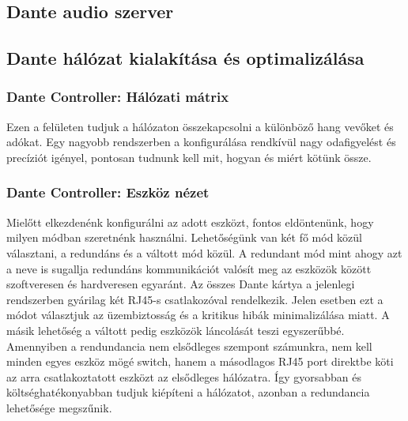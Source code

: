 \subsection{Dante audio szerver}



\subsection{Dante hálózat kialakítása és optimalizálása}
\subsubsection{Dante Controller: Hálózati mátrix}
Ezen a felületen tudjuk a hálózaton összekapcsolni a különböző hang vevőket és
adókat. Egy nagyobb rendszerben a konfigurálása rendkívül nagy odafigyelést és
precíziót igényel, pontosan tudnunk kell mit, hogyan és miért kötünk össze.
\subsubsection{Dante Controller: Eszköz nézet}
Mielőtt elkezdenénk konfigurálni az adott eszközt, fontos eldöntenünk, hogy
milyen módban szeretnénk használni.
Lehetőségünk van két fő mód közül választani, a redundáns és a
váltott mód közül. A redundant mód mint ahogy azt a neve is sugallja
redundáns kommunikációt valósít meg az eszközök között szoftveresen és
hardveresen egyaránt. Az összes Dante kártya a jelenlegi rendszerben gyárilag két RJ45-s
csatlakozóval rendelkezik. Jelen esetben ezt a módot választjuk az
üzembiztosság és a kritikus hibák minimalizálása miatt.
A másik lehetőség a váltott pedig eszközök láncolását
teszi egyszerűbbé. Amennyiben a rendundancia nem elsődleges szempont számunkra, nem kell
minden egyes eszköz mögé switch, hanem a másodlagos RJ45 port direktbe köti
az arra csatlakoztatott eszközt az elsődleges hálózatra. Így gyorsabban és
költséghatékonyabban tudjuk kiépíteni a hálózatot, azonban a redundancia lehetősége megszűnik. 
